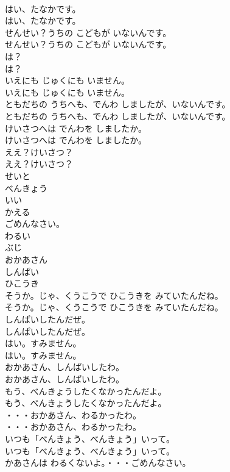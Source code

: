 \documentclass[8pt]{extreport}
\begin{document}
\begin{CJK}{UTF8}{min}
\\	はい、たなかです。
\\	はい、たなかです。
\\	せんせい？うちの こどもが いないんです。
\\	せんせい？うちの こどもが いないんです。
\\	は？
\\	は？
\\	いえにも じゅくにも いません。
\\	いえにも じゅくにも いません。
\\	ともだちの うちへも、でんわ しましたが、いないんです。
\\	ともだちの うちへも、でんわ しましたが、いないんです。
\\	けいさつへは でんわを しましたか。
\\	けいさつへは でんわを しましたか。
\\	ええ？けいさつ？
\\	ええ？けいさつ？
\\	せいと
\\	べんきょう
\\	いい
\\	かえる
\\	ごめんなさい。
\\	わるい
\\	ぶじ
\\	おかあさん
\\	しんぱい
\\	ひこうき
\\	そうか。じゃ、くうこうで ひこうきを みていたんだね。
\\	そうか。じゃ、くうこうで ひこうきを みていたんだね。
\\	しんぱいしたんだぜ。
\\	しんぱいしたんだぜ。
\\	はい。すみません。
\\	はい。すみません。
\\	おかあさん、しんぱいしたわ。
\\	おかあさん、しんぱいしたわ。
\\	もう、べんきょうしたくなかったんだよ。
\\	もう、べんきょうしたくなかったんだよ。
\\	・・・おかあさん、わるかったわ。
\\	・・・おかあさん、わるかったわ。
\\	いつも「べんきょう、べんきょう」いって。
\\	いつも「べんきょう、べんきょう」いって。
\\	かあさんは わるくないよ。・・・ごめんなさい。

\end{CJK}
\end{document}
